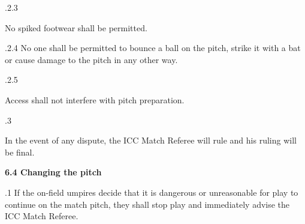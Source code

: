 \documentclass[12pt]{article}
\begin{document}
\vspace{\baselineskip}
\begin{adjustwidth}{0.49in}{0.0in}
{\fontsize{9pt}{10.8pt}.2.3 \tabto{1.17in} {\fontsize{8pt}{9.6pt}\selectfont No spiked footwear shall be permitted.\par}\par}\par

\end{adjustwidth}


\vspace{\baselineskip}
\begin{adjustwidth}{1.18in}{0.12in}
{\fontsize{9pt}{10.8pt}.2.4 \tabto{1.17in} No one shall be permitted to bounce a ball on the pitch, strike it with a bat or cause damage to the pitch in any other way.\par}\par

\end{adjustwidth}


\vspace{\baselineskip}
\begin{adjustwidth}{0.49in}{0.0in}
{\fontsize{9pt}{10.8pt}.2.5 \tabto{1.17in} {\fontsize{8pt}{9.6pt}\selectfont Access shall not interfere with pitch preparation.\par}\par}\par

\end{adjustwidth}


\vspace{\baselineskip}
{\fontsize{9pt}{10.8pt}.3 \tabto{0.49in} {\fontsize{8pt}{9.6pt}\selectfont In the event of any dispute, the ICC Match Referee will rule and his ruling will be final.\par}\par}\par


\vspace{\baselineskip}
{\fontsize{11pt}{13.2pt}\selectfont \textbf{6.4 \tabto{0.47in} Changing the pitch}\par}\par


\vspace{\baselineskip}
\begin{adjustwidth}{0.5in}{0.18in}
{\fontsize{9pt}{10.8pt}.1 \tabto{0.49in} If the on-field umpires decide that it is dangerous or unreasonable for play to continue on the match pitch, they shall stop play and immediately advise the ICC Match Referee.\par}\par

\end{adjustwidth}
\end{document}
